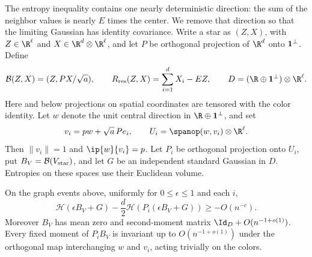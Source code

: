 The entropy inequality contains one nearly deterministic direction:
the sum of the neighbor values is nearly \(E\) times the center.
We remove that direction so that the limiting Gaussian has identity
covariance. Write a star as \((Z,X)\), with
\(Z\in\R^\ell\) and \(X\in\R^d\otimes\R^\ell\), and let \(P\) be
orthogonal projection of \(\R^d\) onto \({\bf1}^{\perp}\).
Define
\[
 \mathcal B(Z,X)=(Z,PX/\sqrt a),\qquad
 R_{\rm res}(Z,X)=\sum_{i=1}^dX_i-EZ,\qquad
 D=(\R\oplus{\bf1}^{\perp})\otimes\R^\ell.
\]
Here and below projections on spatial coordinates are tensored with
the color identity. Let \(w\) denote the unit central direction in
\(\R\oplus{\bf1}^{\perp}\), and set
\[
 v_i=pw+\sqrt a\,Pe_i,\qquad
 U_i=\spanop(w,v_i)\otimes\R^\ell .
\]
Then \(\|v_i\|=1\) and \(\ip{w}{v_i}=p\). Let \(P_i\) be orthogonal
projection onto \(U_i\), put \(B_V=\mathcal B(V_{\rm star})\), and
let \(G\) be an independent standard Gaussian in \(D\). Entropies on
these spaces use their Euclidean volume.

\begin{lemma}\label{ent:projected-entropy}
On the graph events above, uniformly for \(0\le\epsilon\le1\) and
each \(i\),
\begin{equation}\label{eq:ent-projected-entropy}
 \mathcal H(\epsilon B_V+G)
       -\frac d2\mathcal H(P_i(\epsilon B_V+G))
 \ge -O(n^{-c}).
\end{equation}
Moreover \(B_V\) has mean zero and second-moment matrix
\(\Id_D+O(n^{-1+o(1)})\). Every fixed moment of \(P_iB_V\) is
invariant up to \(O(n^{-1+o(1)})\) under the orthogonal map
interchanging \(w\) and \(v_i\), acting trivially on the colors.
\end{lemma}

